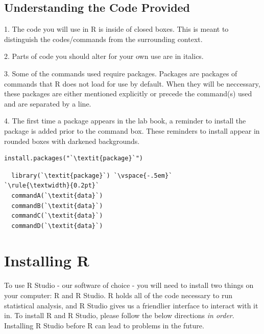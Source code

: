 \documentclass[12pt,letterpaper]{article}
\newcommand{\ind}{\phantom{AA}}
\begin{document}
\vspace{1em}
\subsection{Understanding the Code Provided}
	1. The code you will use in R is inside of closed boxes. This is meant to distinguish the \ind codes/commands from the surrounding context.

\vspace{.5em}
	2. Parts of code you should alter for your own use are in italics.

\vspace{.5em}
	3. Some of the commands used require packages. Packages are packages of commands that \ind R does not load for use by default. When they will be neccessary, these packages are \ind either mentioned explicitly or precede the command(s) used and are separated by a line.

\vspace{.5em}
	4. The first time a package appears in the lab book, a reminder to install the package is  \ind added prior to the command box. These reminders to install appear in rounded boxes \ind with darkened backgrounds.

\vspace{1.5em}
\begin{tcolorbox}[title = Package Example]
\begin{lstlisting}[frameround = t t t t, backgroundcolor = \color{lightgray}]
  install.packages("`\textit{package}`")
\end{lstlisting}
\begin{lstlisting}
  library(`\textit{package}`) `\vspace{-.5em}`
`\rule{\textwidth}{0.2pt}`
  commandA(`\textit{data}`)
  commandB(`\textit{data}`)
  commandC(`\textit{data}`)
  commandD(`\textit{data}`)
\end{lstlisting}
\end{tcolorbox}
\endgroup
\newpage


\section*{Installing R}  

To use R Studio - our software of choice - you will need to install two things on your computer: R and R Studio. R holds all of the code necessary to run statistical analysis, and R Studio gives us a friendlier interface to interact with it in. To install R and R Studio, please follow the below directions \textit{in order}. Installing R Studio before R can lead to problems in the future.
\end{document}
